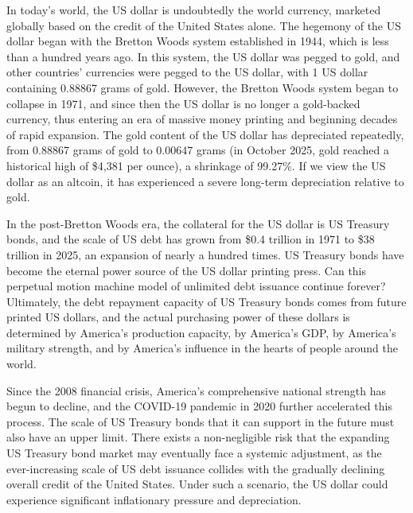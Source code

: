 \documentclass{article}
\begin{document}
In today's world, the US dollar is undoubtedly the world currency, marketed globally based on the credit of the United States alone. The hegemony of the US dollar began with the Bretton Woods system established in 1944\citep{bordo1993bretton}, which is less than a hundred years ago. In this system, the US dollar was pegged to gold, and other countries' currencies were pegged to the US dollar, with 1 US dollar containing 0.88867 grams of gold. However, the Bretton Woods system began to collapse in 1971, and since then the US dollar is no longer a gold-backed currency, thus entering an era of massive money printing and beginning decades of rapid expansion. The gold content of the US dollar has depreciated repeatedly, from 0.88867 grams of gold to 0.00647 grams (in October 2025, gold reached a historical high of \$4,381 per ounce), a shrinkage of 99.27\%. If we view the US dollar as an altcoin, it has experienced a severe long-term depreciation relative to gold.

In the post-Bretton Woods era, the collateral for the US dollar is US Treasury bonds, and the scale of US debt has grown from \$0.4 trillion in 1971 to \$38 trillion in 2025\citep{ustreasury2024debt}, an expansion of nearly a hundred times. US Treasury bonds have become the eternal power source of the US dollar printing press. Can this perpetual motion machine model of unlimited debt issuance continue forever? Ultimately, the debt repayment capacity of US Treasury bonds comes from future printed US dollars, and the actual purchasing power of these dollars is determined by America's production capacity, by America's GDP, by America's military strength, and by America's influence in the hearts of people around the world.

Since the 2008 financial crisis, America's comprehensive national strength has begun to decline, and the COVID-19 pandemic in 2020 further accelerated this process. The scale of US Treasury bonds that it can support in the future must also have an upper limit. There exists a non-negligible risk that the expanding US Treasury bond market may eventually face a systemic adjustment, as the ever-increasing scale of US debt issuance collides with the gradually declining overall credit of the United States. Under such a scenario, the US dollar could experience significant inflationary pressure and depreciation.
\end{document}
